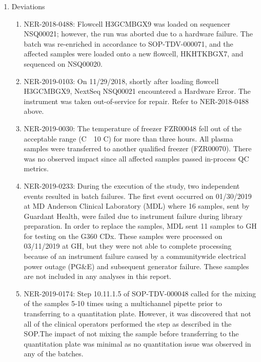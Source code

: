 \documentclass[12pt]{protocol}
\begin{document}
\begin{enumerate}
  	 \color{black}
     \item Deviations
   	 \begin{enumerate}
        \item NER-2018-0488: Flowcell H3GCMBGX9 was loaded on sequencer NSQ00021; however, the run
            was aborted due to a hardware failure. The batch was re-enriched in accordance to
             SOP-TDV-000071, and the affected samples were loaded onto a new flowcell, HKHTKBGX7,
             and sequenced on NSQ00020.
        \item NER-2019-0103: On 11/29/2018, shortly after loading flowcell H3GCMBGX9, NextSeq
            NSQ00021 encountered a Hardware Error. The instrument was taken out-of-service for
             repair.  Refer to NER-2018-0488 above.
        \item NER-2019-0030: The temperature of freezer FZR00048 fell out of the acceptable range
            (\textdegree{}C~\textpm~10 \textdegree{}C) for more than three hours. All
             plasma samples were transferred to another qualified freezer (FZR00070). There was no
             observed impact since all affected samples passed in-process QC metrics.
        \item NER-2019-0233: During the execution of the study, two independent
            events resulted in batch failures. The first event occurred on 01/30/2019 at MD
            Anderson Clinical Laboratory (MDL) where 16 samples, sent by Guardant Health, were
            failed due to instrument failure during library preparation. In order to replace the
            samples, MDL sent 11 samples to GH for testing on the G360 CDx. These samples were
            processed on 03/11/2019 at GH, but they were not able to complete processing because
            of an instrument failure caused by a communitywide electrical power outage (PG\&E) and
            subsequent generator failure. These samples are not included in any analyses in this
            report.
        \item NER-2019-0174: Step 10.11.1.5 of SOP-TDV-000048 called for the mixing of the samples
            5-10 times using a multichannel pipette prior to transferring to a quantitation plate.
            However, it was discovered that not all of the clinical operators performed the step
            as described in the SOP.\@ The impact of not mixing the sample before transferring to
            the quantitation plate was minimal as no quantitation issue was observed in any of the
            batches.
   	\end{enumerate}
\end{enumerate}
\end{document}
